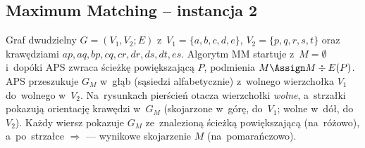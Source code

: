 \subsection{Maximum Matching -- instancja 2}

Graf dwudzielny $G = (V_1, V_2; E)$ z~$V_1 = \{a, b, c, d, e\}$,
$V_2 = \{p, q, r, s, t\}$ oraz krawędziami $ap, aq, bp, cq, cr, dr, ds, dt, es$.
Algorytm \textsc{MM} startuje z~$M = \emptyset$ i~dopóki \textsc{APS} zwraca
ścieżkę powiększającą $P$, podmienia $M \Assign M \div E(P)$. \textsc{APS}
przeszukuje $G_M$ w~głąb (sąsiedzi alfabetycznie) z~wolnego wierzchołka $V_1$
do~wolnego w~$V_2$. Na~rysunkach pierścień otacza wierzchołki \emph{wolne},
a~strzałki pokazują orientację krawędzi w~$G_M$ (skojarzone w~górę, do~$V_1$;
wolne w~dół, do~$V_2$). Każdy wiersz pokazuje $G_M$ ze~znalezioną ścieżką
powiększającą (\textcolor{path}{na~różowo}), a~po~strzałce $\Rightarrow$ ---
wynikowe skojarzenie $M$ (\textcolor{accentB}{na~pomarańczowo}).

\newcommand{\mmfreeRB}[1]{\ifx\relax#1\relax\else
	\foreach \n in {#1} {\draw[black] (\n) circle (3.5pt);}\fi}
\newcommand{\mmedgesB}[9]{%
	\foreach \x/\n in {0/a, 1/b, 2/c, 3/d, 4/e} {\node[mmnodeB, label=above:$\n$] (\n) at (\x,1) {};}
	\foreach \x/\n in {0/p, 1/q, 2/r, 3/s, 4/t} {\node[mmnodeB, label=below:$\n$] (\n) at (\x,0) {};}
	\draw[->,#1] (a)--(p); \draw[->,#2] (a)--(q); \draw[->,#3] (b)--(p); \draw[->,#4] (c)--(q);
	\draw[->,#5] (c)--(r); \draw[->,#6] (d)--(r); \draw[->,#7] (d)--(s); \draw[->,#8] (d)--(t);
	\draw[->,#9] (e)--(s);}
\newcommand{\mmpanelB}[4]{%
	\begin{tikzpicture}[x=0.7cm, y=0.85cm, scale=0.72, >=stealth, baseline=(current bounding box.center)]
		\mmedgesB#1\mmfreeRB{#3}%
		\ifx\relax#4\relax\else\draw[path, line width=1.4pt] (#4) circle (3.5pt);\fi
		\node[font=\footnotesize] at (2,-0.95) {#2};\end{tikzpicture}}

